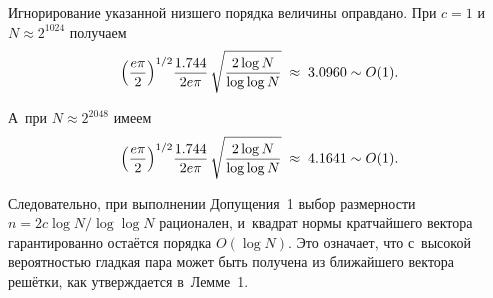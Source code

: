 Игнорирование указанной низшего порядка величины оправдано. При $c=1$ и
$N\approx 2^{1024}$ получаем
\begin{equation}
  \Bigl(\frac{e\pi}{2}\Bigr)^{1/2}
  \frac{1.744}{2e\pi}\,
  \sqrt{\frac{2\log N}{\log\log N}}
  \;\approx\; 3.0960 \sim O(1).
\end{equation}

А при $N\approx 2^{2048}$ имеем
\begin{equation}
  \Bigl(\frac{e\pi}{2}\Bigr)^{1/2}
  \frac{1.744}{2e\pi}\,
  \sqrt{\frac{2\log N}{\log\log N}}
  \;\approx\; 4.1641 \sim O(1).
\end{equation}

Следовательно, при выполнении Допущения 1 выбор размерности $n=2c\log
N/\log\log N$ рационален, и квадрат нормы кратчайшего вектора гарантированно
остаётся порядка $O(\log N)$. Это означает, что с высокой вероятностью гладкая
пара может быть получена из ближайшего вектора решётки, как утверждается
в Лемме 1.

